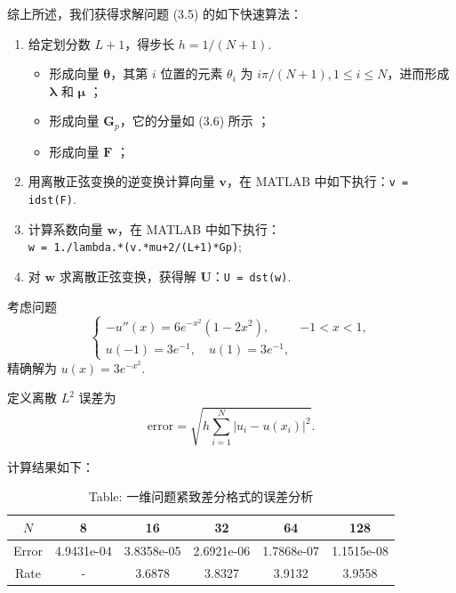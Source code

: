 综上所述，我们获得求解问题 (3.5) 的如下快速算法：

\begin{enumerate}[label=步 \arabic*.]
    \item 给定划分数 $L+1$，得步长 $h = 1/(N+1)$.
    \begin{itemize}
        \item 形成向量 $\boldsymbol{\theta}$，其第 $i$ 位置的元素 $\theta_i$ 为 $i\pi/(N+1), 1 \leq i \leq N$，进而形成 $\boldsymbol{\lambda}$ 和 $\boldsymbol{\mu}$ ；
        \item 形成向量 $\bm{G}_p$，它的分量如 (3.6) 所示 ；
        \item 形成向量 $\bm{F}$ ；
    \end{itemize}
    
    \item 用离散正弦变换的逆变换计算向量 $\bm{v}$，在 MATLAB 中如下执行：\texttt{v = idst(F)}.
    
    \item 计算系数向量 $\bm{w}$，在 MATLAB 中如下执行： \\
    \texttt{w = 1./lambda.*(v.*mu+2/(L+1)*Gp)};
    
    \item 对 $\bm{w}$ 求离散正弦变换，获得解 $\bm{U}$：\texttt{U = dst(w)}.
\end{enumerate}

\begin{instance}
    考虑问题
\begin{equation*}
    \begin{cases} 
    -u''(x) = 6e^{-x^2}(1-2x^2), & -1 < x < 1, \\ 
    u(-1) = 3e^{-1}, \quad u(1) = 3e^{-1}, 
    \end{cases} 
\end{equation*}
精确解为 $u(x) = 3e^{-x^2}$.

定义离散 $L^2$ 误差为
\begin{equation*}
    \text{error} = \sqrt{h \sum_{i=1}^N |u_i - u(x_i)|^2}.
\end{equation*}

计算结果如下：

\begin{table}[H]
    \centering
    \caption*{Table: 一维问题紧致差分格式的误差分析}
    \begin{tabular}{cccccc}
        \hline
        $N$ & 8 & 16 & 32 & 64 & 128 \\ 
        \hline
        Error & 4.9431e-04 & 3.8358e-05 & 2.6921e-06 & 1.7868e-07 & 1.1515e-08  \\ 
        Rate & - & 3.6878 & 3.8327 & 3.9132 & 3.9558  \\ 
        \hline
    \end{tabular}
\end{table}
\end{instance}
